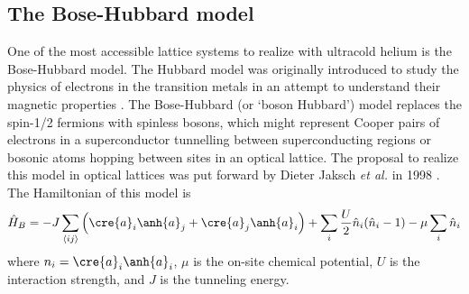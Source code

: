 	

\subsection{The Bose-Hubbard model}

	One of the most accessible lattice systems to realize with ultracold helium is the Bose-Hubbard model.
	The Hubbard model was originally introduced to study the physics of electrons in the transition metals in an attempt to understand their magnetic properties \cite{SachdevQPT}.
	The Bose-Hubbard (or `boson Hubbard') model replaces the spin-1/2 fermions with spinless bosons, which might represent Cooper pairs of electrons in a superconductor tunnelling between superconducting regions or bosonic atoms hopping between sites in an optical lattice.
	The proposal to realize this model in optical lattices was put forward by Dieter Jaksch \emph{et al.} in 1998 \cite{Jaksch98}.
	The Hamiltonian of this model is 
	\begin{equation}
		\hat{H}_B = -J\sum_{\langle i j\rangle}\left(\cre{a}_i\anh{a}_j+\cre{a}_j\anh{a}_i\right) 
		+	\sum_{i} \frac{U}{2}\hat{n}_{i}(\hat{n}_{i}-1) 
		- \mu\sum_{i} \hat{n}_i
		\label{eqn:BH_ham}
	\end{equation}
	where $n_i = \cre{a}_i\anh{a}_i$, $\mu$ is the on-site chemical potential, $U$ is the interaction strength, and $J$ is the tunneling energy.
	

